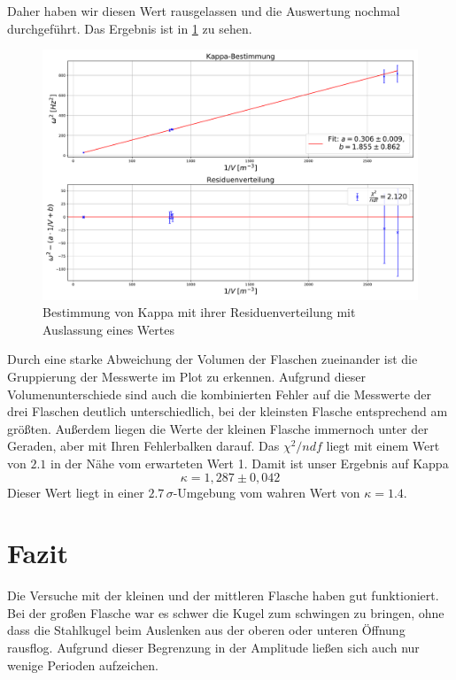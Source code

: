 \documentclass[a4paper, 11pt]{article}
\begin{document}
Daher haben wir diesen Wert rausgelassen und die Auswertung nochmal durchgeführt. Das Ergebnis ist in \ref{fig:LinregressOhneWert} zu sehen.

\begin{figure}[H]
	\centering
	\includegraphics[scale=0.4]{../Plots/Kappa-Bestimmung_ohneWert_NEU.pdf}
	\caption{Bestimmung von Kappa mit ihrer Residuenverteilung mit Auslassung eines Wertes}
	\label{fig:LinregressOhneWert}
\end{figure}

Durch eine starke Abweichung der Volumen der Flaschen zueinander ist die Gruppierung der Messwerte im Plot zu erkennen. Aufgrund dieser Volumenunterschiede sind auch die kombinierten Fehler auf die Messwerte der drei Flaschen deutlich unterschiedlich, bei der kleinsten Flasche entsprechend am größten. Außerdem liegen die Werte der kleinen Flasche immernoch unter der Geraden, aber mit Ihren Fehlerbalken darauf. Das $\chi^2/ndf$ liegt mit einem Wert von $2.1$ in der Nähe vom erwarteten Wert 1. 
Damit ist unser Ergebnis auf Kappa
\begin{equation}
\kappa = 1,287 \pm 0,042
\end{equation}
Dieser Wert liegt in einer $2.7 \, \sigma$-Umgebung vom wahren Wert von $\kappa = 1.4$.


\section{Fazit}
Die Versuche mit der kleinen und der mittleren Flasche haben gut funktioniert. Bei der großen Flasche war es schwer die Kugel zum schwingen zu bringen, ohne dass die Stahlkugel beim Auslenken aus der oberen oder unteren Öffnung rausflog. Aufgrund dieser Begrenzung in der Amplitude ließen sich auch nur wenige Perioden aufzeichen.
\end{document}
